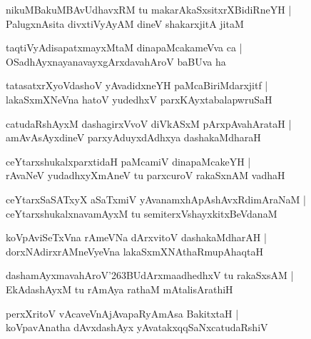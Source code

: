 \documentclass[twoside,12pt,openright]{book}
\def\S{\char'263}
\newcounter{shloka}[chapter]
\begin{document}
\begin{shloka}%
nikuMBakuMBAvUdhavxRM tu makarAkaSxsitxrXBidiRneYH |\\
PalugxnAsita divxtiVyAyAM dineV shakarxjitA jitaM 
\end{shloka}

\begin{shloka}%
taqtiVyAdisapatxmayxMtaM dinapaMcakameVva ca |\\
OSadhAyxnayanavayxgArxdavahAroV baBUva ha 
\end{shloka}

\begin{shloka}%
tatasatxrXyoVdashoV yAvadidxneYH paMcaBiriMdarxjitf |\\
lakaSxmXNeVna hatoV yudedhxV parxKAyxtabalapwruSaH 
\end{shloka}

\begin{shloka}%
catudaRshAyxM dashagirxVvoV diVkASxM pArxpAvahArataH |\\
amAvAsAyxdineV parxyAduyxdAdhxya dashakaMdharaH 
\end{shloka}

\begin{shloka}%
ceYtarxshukalxparxtidaH paMcamiV dinapaMcakeYH |\\
rAvaNeV yudadhxyXmAneV tu parxcuroV rakaSxnAM vadhaH
\end{shloka}

\begin{shloka}%
ceYtarxSaSATxyX aSaTxmiV yAvanamxhApAshAvxRdimAraNaM |\\
ceYtarxshukalxnavamAyxM tu semiterxVshayxkitxBeVdanaM 
\end{shloka}

\begin{shloka}%
koVpAviSeTxVna rAmeVNa dArxvitoV dashakaMdharAH |\\
dorxNAdirxrAMneVyeVna lakaSxmXNAthaRmupAhaqtaH 
\end{shloka}

\begin{shloka}%
dashamAyxmavahAroV\S BUdArxmaadhedhxV tu rakaSxsAM |\\
EkAdashAyxM tu rAmAya rathaM mAtalisArathiH 
\end{shloka}

\begin{shloka}%
perxXritoV vAcaveVnAjAvapaRyAmAsa BakitxtaH |\\
koVpavAnatha dAvxdashAyx yAvatakxqqSaNxcatudaRshiV 
\end{shloka}
\end{document}
